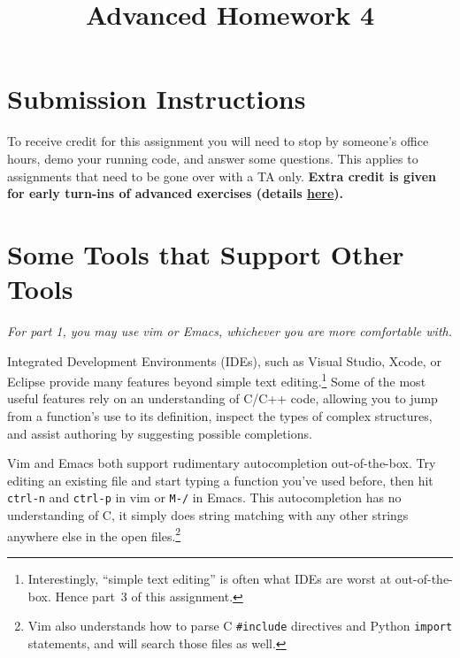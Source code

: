 \documentclass{article}
\begin{document}
\fancyfoot[C]{\color{gray} \thepage~/~\pageref*{LastPage}}
\pagestyle{fancyplain}

\title{\textbf{Advanced Homework 4\\}}
\author{\textbf{\color{red}{Due: Wednesday, February 7th, 11:59PM (Hard Deadline)}}}
\date{}
\maketitle


\section*{Submission Instructions}
To receive credit for this assignment you will need to stop by someone's
office hours, demo your running code, and answer some questions. \textbf{\color{red}{Make sure
to check the office hour schedule as the real due date is at the last office
hours before the date listed above.}} This applies to assignments that need to be gone over with a TA only.
\textbf{Extra credit is given for early turn-ins of advanced exercises (details \href{https://c4cs.github.io/\#syllabus-advanced}{here}).}

\noindent
\section{Some Tools that Support Other Tools}
\emph{For part 1, you may use vim or Emacs, whichever you are more comfortable with.}

Integrated Development Environments (IDEs), such as Visual Studio, Xcode, or
Eclipse provide many features beyond simple text editing.\footnote{
  Interestingly, ``simple text editing'' is often what IDEs are worst at
  out-of-the-box. Hence part~3 of this assignment.
}
Some of the most useful features rely on an understanding of C/C++ code,
allowing you to jump from a function's use to its definition, inspect the types
of complex structures, and assist authoring by suggesting possible
completions.

Vim and Emacs both support rudimentary autocompletion out-of-the-box. Try
editing an existing file and start typing a function you've used before, then
hit \texttt{ctrl-n} and \texttt{ctrl-p} in vim or \texttt{M-/} in Emacs. This
autocompletion has no understanding of C, it simply does string matching with
any other strings anywhere else in the open files.\footnote{
  Vim also understands how to parse C \texttt{\#include} directives and Python
  \texttt{import} statements, and will search those files as well.
}
\end{document}

